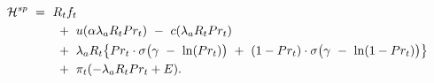 \begin{equation}
\begin{split}
    \mathcal{H}^{sp} \ 
    & = \ R_{t} f_{t} \\
    & \hspace{0.7cm} + \ u(\alpha \lambda_{a} R_{t} Pr_{t}) \ - \ c(\lambda_{a} R_{t} Pr_{t}) \\
    & \hspace{0.7cm} + \ \lambda_{a} R_{t} \big\{ Pr_{t} \cdot \sigma \big( \gamma \ - \ \ln(Pr_{t}) \big) \ + \ (1 - Pr_{t}) \cdot \sigma \big( \gamma \ - \ \ln( 1 - Pr_{t}) \big) \big\} \\
    & \hspace{0.7cm} + \ \pi_{t} (-\lambda_{a} R_{t} Pr_{t} + E).
\end{split}
\label{Equation:Social-Planners-Problem_Hamiltonian-Lagrangian}
\end{equation}